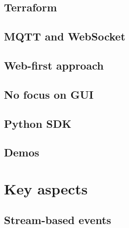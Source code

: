 \subsection{Terraform}
\label{chapter4-terraform}

\subsection{MQTT and WebSocket}
\label{chapter4-mqtt-and-websocket}

\subsection{Web-first approach}
\label{chapter4-web-first-approach}

\subsection{No focus on GUI}
\label{chapter4-no-focus-on-gui}

\subsection{Python SDK}
\label{chapter4-python-sdk}

\subsection{Demos}
\label{chapter4-demos}

\section{Key aspects}
\label{chapter4-key-aspects}

\subsection{Stream-based events}
\label{chapter4-stream-based-events}

